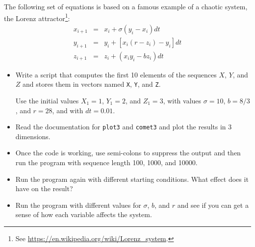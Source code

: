 \documentclass[
]{book}
\numberwithin{Answer}{chapter}
\numberwithin{Exercise}{chapter}
\begin{document}
\begin{ex}
The following set of equations is based on a famous example of a chaotic system, the Lorenz attractor\footnote{See \url{https://en.wikipedia.org/wiki/Lorenz_system}.}:
%
\begin{eqnarray}
x_{i+1} &=& x_i + \sigma \left( y_i - x_i \right) dt  \\
y_{i+1} &=& y_i + \left[ x_i (r - z_i) - y_i \right] dt   \\
z_{i+1} &=& z_i + \left( x_i y_i - b z_i \right) dt
\end{eqnarray}
%
\begin{itemize}

\item Write a script that computes the first 10 elements of the sequences
$X$, $Y$, and $Z$ and stores them in vectors named {\tt X}, {\tt Y},
and {\tt Z}.

Use the initial values $X_1 = 1$, $Y_1 = 2$, and $Z_1 = 3$, with values
$\sigma = 10$, $b = 8/3$, and $r = 28$, and with $dt = 0.01$.

\item Read the documentation for {\tt plot3} and {\tt comet3} and
plot the results in 3 dimensions.

\item Once the code is working, use semi-colons to suppress the output
and then run the program with sequence length 100, 1000, and 10000.

\item Run the program again with different starting conditions.
What effect does it have on the result?

\item Run the program with different values for $\sigma$, $b$, and $r$
and see if you can get a sense of how each variable affects the
system.

\end{itemize}

\end{ex}
\end{document}
